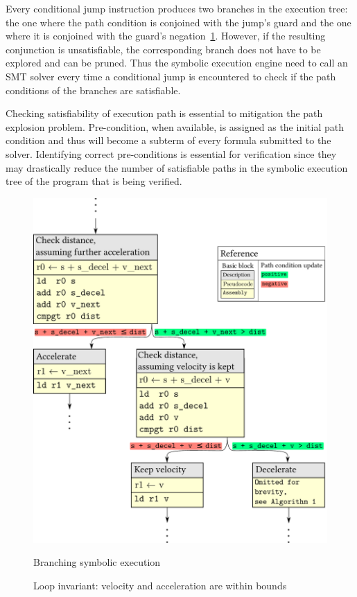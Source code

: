 Every conditional jump instruction produces two branches in the execution tree: the one
where the path condition is conjoined with the jump's guard and the one where it is
conjoined with the guard's negation~\ref{fig-sym-tree}. However, if the resulting
conjunction is unsatisfiable, the corresponding branch does not have to be explored
and can be pruned. Thus the symbolic execution engine need to call an SMT solver every
time a conditional jump is encountered to check if the path conditions of the branches
are satisfiable.

Checking satisfiability of execution path is essential to mitigation the path explosion
problem. Pre-condition, when available, is assigned as the initial path condition and thus
will become a subterm of every formula submitted to the solver. Identifying correct pre-conditions is essential for verification since they may drastically reduce the number of satisfiable paths in the symbolic execution tree of the program that is being verified.

\begin{figure}[h]
\centerline{\includegraphics[scale=0.4]{fig/sym-tree.pdf}}
\caption{Branching symbolic execution\label{fig-sym-tree}}
\caption{Loop invariant: velocity and acceleration are within bounds}
\end{figure}



